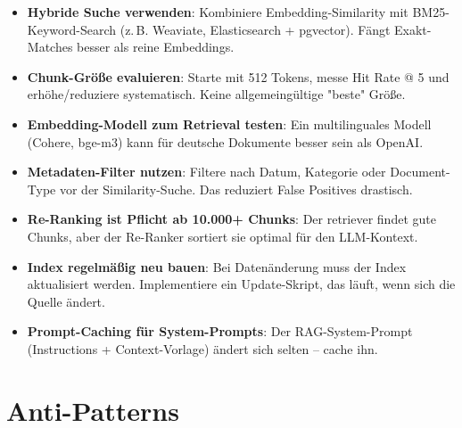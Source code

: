 \begin{itemize}[leftmargin=*]
    \item \textbf{Hybride Suche verwenden}: Kombiniere Embedding-Similarity mit BM25-Keyword-Search (z.\,B. Weaviate, Elasticsearch + pgvector). Fängt Exakt-Matches besser als reine Embeddings.
    \item \textbf{Chunk-Größe evaluieren}: Starte mit 512 Tokens, messe Hit Rate @ 5 und erhöhe/reduziere systematisch. Keine allgemeingültige "beste" Größe.
    \item \textbf{Embedding-Modell zum Retrieval testen}: Ein multilinguales Modell (Cohere, bge-m3) kann für deutsche Dokumente besser sein als OpenAI.
    \item \textbf{Metadaten-Filter nutzen}: Filtere nach Datum, Kategorie oder Document-Type vor der Similarity-Suche. Das reduziert False Positives drastisch.
    \item \textbf{Re-Ranking ist Pflicht ab 10.000+ Chunks}: Der retriever findet gute Chunks, aber der Re-Ranker sortiert sie optimal für den LLM-Kontext.
    \item \textbf{Index regelmäßig neu bauen}: Bei Datenänderung muss der Index aktualisiert werden. Implementiere ein Update-Skript, das läuft, wenn sich die Quelle ändert.
    \item \textbf{Prompt-Caching für System-Prompts}: Der RAG-System-Prompt (Instructions + Context-Vorlage) ändert sich selten -- cache ihn.
\end{itemize}

\section{Anti-Patterns}

